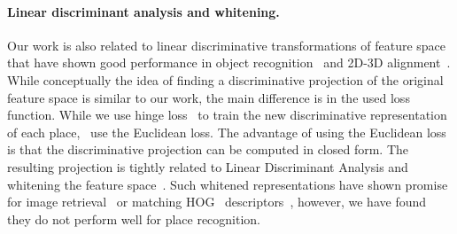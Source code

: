 \paragraph{Linear discriminant analysis and whitening.}
  \textcolor{petr}{
 Our work is also related to linear discriminative transformations of feature space that have shown good performance in object recognition~\cite{Gharbi12,Hariharan12} and 2D-3D alignment~\cite{Aubry13,Aubry14}. While conceptually the idea of finding a discriminative projection of the original feature space is similar to our work, the main difference is in the used loss function. 
  While %
  we use hinge loss~\cite{scholkopf2002learning} to train the new discriminative representation of each place,~\cite{Aubry13,Gharbi12,Hariharan12} use the Euclidean loss. The advantage of using the Euclidean loss is that the discriminative projection can be computed in closed form. The resulting projection is tightly related to Linear Discriminant Analysis and whitening the feature space~\cite{Aubry13,Gharbi12,Hariharan12}. Such whitened representations have shown promise 
  for image retrieval~\cite{JegouChum12} or matching HOG~\cite{Dalal05} descriptors~\cite{Doersch13}, however, we have found they do not perform well for place recognition.
  }
    
 
  



